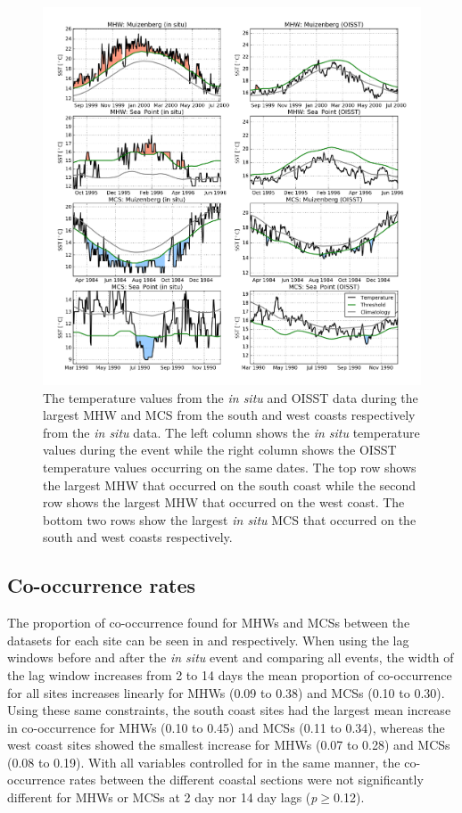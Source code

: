 \documentclass[a4paper,10pt,review]{elsarticle}
\begin{document}
\begin{figure}
\centering
\includegraphics[width=1.0\textwidth]{figure3.png}
\caption{The temperature values from the \emph{in situ} and OISST data during the largest MHW and MCS from the south and west coasts respectively from the \emph{in situ} data. The left column shows the \emph{in situ} temperature values during the event while the right column shows the OISST temperature values occurring on the same dates. The top row shows the largest MHW that occurred on the south coast while the second row shows the largest MHW that occurred on the west coast. The bottom two rows show the largest \emph{in situ} MCS that occurred on the south and west coasts respectively.}
\label{fig:Figure3}
\end{figure}

\subsection{Co-occurrence rates}
The proportion of co-occurrence found for MHWs and MCSs between the datasets for each site can be seen in  and  respectively. When using the lag windows before and after the \emph{in situ} event and comparing all events, the width of the lag window increases from 2 to 14 days the mean proportion of co-occurrence for all sites increases linearly for MHWs (0.09 to 0.38) and MCSs (0.10 to 0.30). Using these same constraints, the south coast sites had the largest mean increase in co-occurrence for MHWs (0.10 to 0.45) and MCSs (0.11 to 0.34), whereas the west coast sites showed the smallest increase for MHWs (0.07 to 0.28) and MCSs (0.08 to 0.19). With all variables controlled for in the same manner, the co-occurrence rates between the different coastal sections were not significantly different for MHWs or MCSs at 2 day nor 14 day lags (\emph{p}$\geq$0.12).
\end{document}
